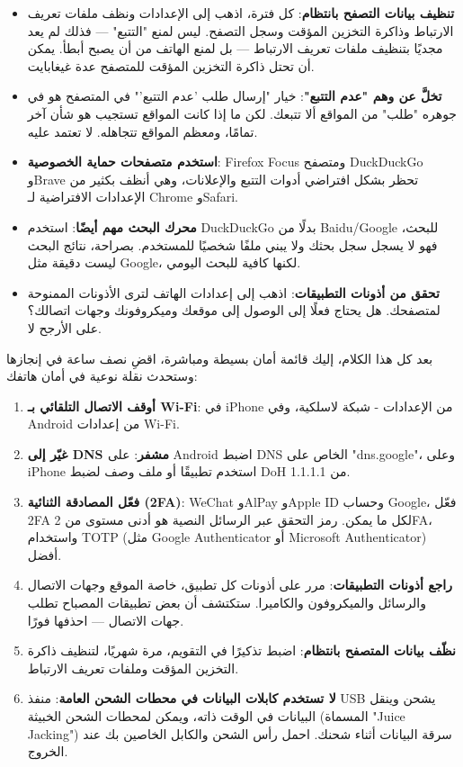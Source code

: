 \begin{itemize}
  \item \textbf{تنظيف بيانات التصفح بانتظام}: كل فترة، اذهب إلى الإعدادات ونظف ملفات تعريف الارتباط وذاكرة التخزين المؤقت وسجل التصفح. ليس لمنع "التتبع" — فذلك لم يعد مجديًا بتنظيف ملفات تعريف الارتباط — بل لمنع الهاتف من أن يصبح أبطأ. يمكن أن تحتل ذاكرة التخزين المؤقت للمتصفح عدة غيغابايت.
  \item \textbf{تخلَّ عن وهم "عدم التتبع"}: خيار "إرسال طلب 'عدم التتبع'" في المتصفح هو في جوهره "طلب" من المواقع ألا تتبعك. لكن ما إذا كانت المواقع تستجيب هو شأن آخر تمامًا، ومعظم المواقع تتجاهله. لا تعتمد عليه.
  \item \textbf{استخدم متصفحات حماية الخصوصية}: Firefox Focus ومتصفح DuckDuckGo وBrave تحظر بشكل افتراضي أدوات التتبع والإعلانات، وهي أنظف بكثير من الإعدادات الافتراضية لـ Chrome وSafari.
  \item \textbf{محرك البحث مهم أيضًا}: استخدم DuckDuckGo بدلًا من Baidu/Google للبحث، فهو لا يسجل سجل بحثك ولا يبني ملفًا شخصيًا للمستخدم. بصراحة، نتائج البحث ليست دقيقة مثل Google، لكنها كافية للبحث اليومي.
  \item \textbf{تحقق من أذونات التطبيقات}: اذهب إلى إعدادات الهاتف لترى الأذونات الممنوحة لمتصفحك. هل يحتاج فعلًا إلى الوصول إلى موقعك وميكروفونك وجهات اتصالك؟ على الأرجح لا.
\end{itemize}


بعد كل هذا الكلام، إليك قائمة أمان بسيطة ومباشرة، اقضِ نصف ساعة في إنجازها وستحدث نقلة نوعية في أمان هاتفك:

\begin{enumerate}
  \item \textbf{أوقف الاتصال التلقائي بـ Wi-Fi}: في iPhone من الإعدادات - شبكة لاسلكية، وفي Android من إعدادات Wi-Fi.
  \item \textbf{غيّر إلى DNS مشفر}: على Android اضبط DNS الخاص على "dns.google"، وعلى iPhone استخدم تطبيقًا أو ملف وصف لضبط DoH من 1.1.1.1.
  \item \textbf{فعّل المصادقة الثنائية (2FA)}: WeChat وAlPay وApple ID وحساب Google، فعّل 2FA لكل ما يمكن. رمز التحقق عبر الرسائل النصية هو أدنى مستوى من 2FA، واستخدام TOTP (مثل Google Authenticator أو Microsoft Authenticator) أفضل.
  \item \textbf{راجع أذونات التطبيقات}: مرر على أذونات كل تطبيق، خاصة الموقع وجهات الاتصال والرسائل والميكروفون والكاميرا. ستكتشف أن بعض تطبيقات المصباح تطلب جهات الاتصال — احذفها فورًا.
  \item \textbf{نظّف بيانات المتصفح بانتظام}: اضبط تذكيرًا في التقويم، مرة شهريًا، لتنظيف ذاكرة التخزين المؤقت وملفات تعريف الارتباط.
  \item \textbf{لا تستخدم كابلات البيانات في محطات الشحن العامة}: منفذ USB يشحن وينقل البيانات في الوقت ذاته، ويمكن لمحطات الشحن الخبيثة (المسماة "Juice Jacking") سرقة البيانات أثناء شحنك. احمل رأس الشحن والكابل الخاصين بك عند الخروج.
\end{enumerate}

